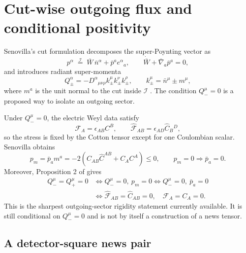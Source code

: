 \documentclass[11pt,a4paper]{article}
\newcommand{\scri}{\mathscr{I}}
\newcommand{\cF}{\mathcal{F}}
\begin{document}
\section{Cut-wise outgoing flux and conditional positivity}

Senovilla's cut formulation decomposes the super-Poynting vector as
\begin{equation}
  p^\alpha\;\stackrel{\scri}{=}\;\bar W\,\bar n^\alpha+\bar p^a e^\alpha{}_a,
  \qquad
  \dot{\bar W}+\bar\nabla_a\bar p^a=0 ,
\end{equation}
and introduces radiant super-momenta
\begin{equation}
  Q_\pm^\alpha
  =
  -D^\alpha{}_{\mu\nu\rho}k_\pm^\mu k_\pm^\nu k_\pm^\rho,
  \qquad
  k_\pm^\mu=\bar n^\mu\pm m^\mu ,
\end{equation}
where \(m^a\) is the unit normal to the cut inside \(\scri\) \cite{senovilla2022radiation}.  The condition \(Q_-^\mu=0\) is a proposed way to isolate an outgoing sector.

Under \(Q_-^\mu=0\), the electric Weyl data satisfy
\begin{equation}
  \cF_A=\epsilon_{AB}C^B,
  \qquad
  \hat{\cF}_{AB}=\epsilon_{AD}\hat C_B{}^D ,
\end{equation}
so the stress is fixed by the Cotton tensor except for one Coulombian scalar.  Senovilla obtains
\begin{equation}\label{eq:outgoing-pm}
  p_m=\bar p_a m^a
  =
  -2\left(
    \hat C_{AB}\hat C^{AB}+C_A C^A
  \right)
  \le 0,
  \qquad
  p_m=0\Rightarrow \bar p_a=0 .
\end{equation}
Moreover, Proposition 2 of \cite{senovilla2022radiation} gives
\begin{align}
  Q_-^\mu=Q_+^\mu=0
  &\iff Q_-^\mu=0,\ p_m=0
  \iff Q_-^\mu=0,\ \bar p_a=0\\
  &\iff
  \hat{\cF}_{AB}=\hat C_{AB}=0,
  \quad
  \cF_A=C_A=0 .
\end{align}
This is the sharpest outgoing-sector rigidity statement currently available.  It is still conditional on \(Q_-^\mu=0\) and is not by itself a construction of a news tensor.

\subsection{A detector-square news pair}
\end{document}

